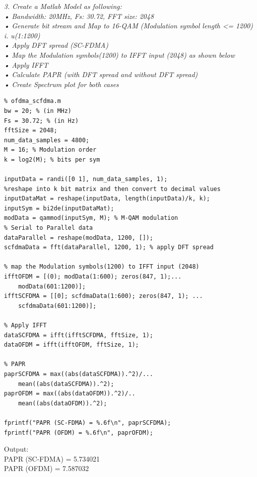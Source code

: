 \documentclass[a4paper]{article}
\begin{document}
\bigskip
\textit{3. Create a Matlab Model as following:\\[10pt]
    • Bandwidth: 20MHz, Fs: 30.72, FFT size: 2048 \\
    • Generate bit stream and Map to 16-QAM (Modulation symbol length <= 1200) 
            i. u(1:1200) \\
    • Apply DFT spread (SC-FDMA)\\
    • Map the Modulation symbols(1200) to IFFT input (2048) as shown below\\
    • Apply IFFT \\
    • Calculate PAPR (with DFT spread and without DFT spread) \\
    • Create Spectrum plot for both cases\\
}
\bigskip
{}
\begin{verbatim}
% ofdma_scfdma.m
bw = 20; % (in MHz)
Fs = 30.72; % (in Hz)
fftSize = 2048;
num_data_samples = 4800;
M = 16; % Modulation order
k = log2(M); % bits per sym

inputData = randi([0 1], num_data_samples, 1);
%reshape into k bit matrix and then convert to decimal values
inputDataMat = reshape(inputData, length(inputData)/k, k);
inputSym = bi2de(inputDataMat);
modData = qammod(inputSym, M); % M-QAM modulation
% Serial to Parallel data
dataParallel = reshape(modData, 1200, []);
scfdmaData = fft(dataParallel, 1200, 1); % apply DFT spread

% map the Modulation symbols(1200) to IFFT input (2048)
ifftOFDM = [(0); modData(1:600); zeros(847, 1);...
    modData(601:1200)];
ifftSCFDMA = [[0]; scfdmaData(1:600); zeros(847, 1); ...
    scfdmaData(601:1200)];

% Apply IFFT
dataSCFDMA = ifft(ifftSCFDMA, fftSize, 1);
dataOFDM = ifft(ifftOFDM, fftSize, 1);

% PAPR
paprSCFDMA = max((abs(dataSCFDMA)).^2)/...
    mean((abs(dataSCFDMA)).^2);
paprOFDM = max((abs(dataOFDM)).^2)/..
    mean((abs(dataOFDM)).^2);

fprintf("PAPR (SC-FDMA) = %.6f\n", paprSCFDMA);
fprintf("PAPR (OFDM) = %.6f\n", paprOFDM);
\end{verbatim}
Output:\\[10pt]
PAPR (SC-FDMA) = 5.734021\\
PAPR (OFDM) = 7.587032\\
\end{document}
